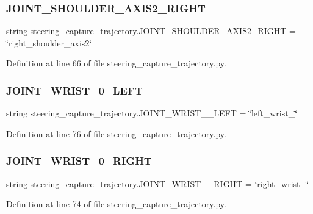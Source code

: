 \subsubsection{\texorpdfstring{JOINT\_SHOULDER\_AXIS2\_RIGHT}{JOINT\_SHOULDER\_AXIS2\_RIGHT}}
{\footnotesize\ttfamily string steering\+\_\+capture\+\_\+trajectory.\+J\+O\+I\+N\+T\+\_\+\+S\+H\+O\+U\+L\+D\+E\+R\+\_\+\+A\+X\+I\+S2\+\_\+\+R\+I\+G\+HT = \char`\"{}right\+\_\+shoulder\+\_\+axis2\char`\"{}}



Definition at line 66 of file steering\+\_\+capture\+\_\+trajectory.\+py.

\mbox{\label{namespacesteering__capture__trajectory_a58d4b644a3b5fa765a5e2279e154dae8}} 
\subsubsection{\texorpdfstring{JOINT\_WRIST\_0\_LEFT}{JOINT\_WRIST\_0\_LEFT}}
{\footnotesize\ttfamily string steering\+\_\+capture\+\_\+trajectory.\+J\+O\+I\+N\+T\+\_\+\+W\+R\+I\+S\+T\+\_\+\_\+\+L\+E\+FT = \char`\"{}left\+\_\+wrist\+\_\char`\"{}}



Definition at line 76 of file steering\+\_\+capture\+\_\+trajectory.\+py.

\mbox{\label{namespacesteering__capture__trajectory_a383cd035a5617d903cae0ef48987d360}} 
\subsubsection{\texorpdfstring{JOINT\_WRIST\_0\_RIGHT}{JOINT\_WRIST\_0\_RIGHT}}
{\footnotesize\ttfamily string steering\+\_\+capture\+\_\+trajectory.\+J\+O\+I\+N\+T\+\_\+\+W\+R\+I\+S\+T\+\_\+\_\+\+R\+I\+G\+HT = \char`\"{}right\+\_\+wrist\+\_\char`\"{}}



Definition at line 74 of file steering\+\_\+capture\+\_\+trajectory.\+py.

